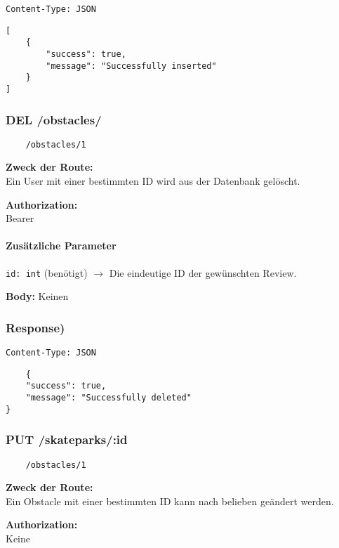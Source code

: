 \lstinline{Content-Type: JSON}
\begin{lstlisting}
[
    {
        "success": true,
        "message": "Successfully inserted"
    }
]
\end{lstlisting}

\pagebreak


\subsubsection{DEL /obstacles/}

\begin{lstlisting}
    /obstacles/1
\end{lstlisting}

\textbf{Zweck der Route:} \\
Ein User mit einer bestimmten ID wird aus der Datenbank gelöscht.

\textbf{Authorization:} \\
Bearer

\paragraph{Zusätzliche Parameter}
\lstinline{id: int} (benötigt)
$\rightarrow$ Die eindeutige ID der gewünschten Review.

\textbf{Body:}
Keinen


\subsubsection{Response)}

\lstinline{Content-Type: JSON}
\begin{lstlisting}
    {
    "success": true,
    "message": "Successfully deleted"
}
\end{lstlisting}

\pagebreak


\subsubsection{PUT /skateparks/:id}

\begin{lstlisting}
    /obstacles/1
\end{lstlisting}

\textbf{Zweck der Route:} \\
Ein Obstacle mit einer bestimmten ID kann nach belieben geändert werden.

\textbf{Authorization:} \\
Keine

